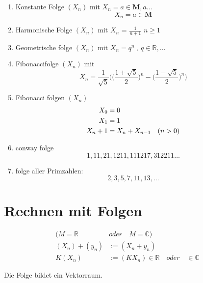 \begin{example}
    \[\]
    \begin{enumerate}

        \item Konstante Folge $(X_n)$ mit \quad $X_n = a \in \mathbf{M },a \dots$ \\
        \[ X_n = a \in \mathbf{M} \]
        \item Harmonische Folge $(X_n)$  mit $X_n$ =  $\frac{1}{n+1}$ \quad$ n \geq 1$
        \item Geometrische folge $(X_n)$ mit $X_n = q^n \:, \: q \in \mathbb{R}, \dots $
        \item Fibonaccifolge $(X_n)$ mit
        \[ X_n =\frac{1}{\sqrt{5}} \Big(  \big( \frac{1+ \sqrt{5}}{2} \big)^n - \big( \frac{1- \sqrt{5}}{2}\big)^n   \Big)    \]

        \item Fibonacci folgen $(X_n)$
        \begin{align}
            X_0 &=0 \notag \\X_1 &= 1 \notag \\
            X_n+1 &= X_n+X_{n-1} \quad (n>0)  \notag
        \end{align}

        \item conway  folge
        \[ 1, 11 ,21 , 1211, 111217, 312211 \dots \]

        \item folge aller Primzahlen: \[ 2, 3 ,5 ,7 ,11, 13 , \dots \]

    \end{enumerate}
\end{example}

\section{Rechnen mit Folgen }
\begin{align*}
    ( M  = \mathbb{R} \quad & oder \quad M = \mathbb{C} ) \\
    (X_n)+(y_n) &:= (X_n+y_n)\\
    K(X_n)&:=(KX_n)\in \mathbb{R} \quad  oder \quad \in  \mathbb{C}
\end{align*}
\begin{remark}

    Die Folge bildet ein Vektorraum.
\end{remark}
\newpage

